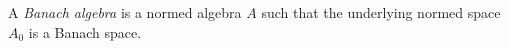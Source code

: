 A \emph{Banach algebra} is a normed algebra $A$ such that the underlying normed space $A_0$ is a Banach space.
